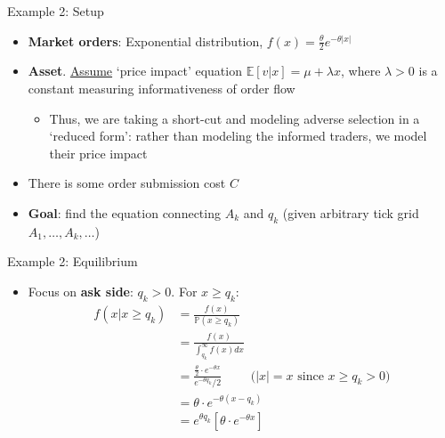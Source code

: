 \documentclass[english,10pt
,aspectratio=169
]{beamer}
\begin{document}
\begin{frame}{Example 2: Setup}
	\begin{itemize}
		\item \textbf{Market orders}: Exponential distribution, $f(x)=\frac{\theta}{2} e^{-\theta|x|}$
		\item \textbf{Asset}. \underline{Assume} `price impact' equation $\mathbb{E}[v|x] = \mu + \lambda x$, where $\lambda >0$ is a constant measuring informativeness of order flow
		\begin{itemize}
			\item Thus, we are taking a short-cut and modeling adverse selection in a `reduced form': rather than modeling the informed traders, we model their price impact
		\end{itemize}
		\item There is some order submission cost $C$
		\item \textbf{Goal}: find the equation connecting $A_k$ and $q_k$ (given arbitrary tick grid $A_1,\dots,A_k,\dots$)
	\end{itemize}
\end{frame}


\begin{frame}{Example 2: Equilibrium}
	\begin{itemize}
		\item Focus on \textbf{ask side}: $q_k>0$. For $x \geq q_k$:
		\begin{align*}
			f(x|x \geq q_k)&=\frac{f(x)}{ \mathbb{P}(x \geq q_k)} \\
			&= \frac{f(x)}{\int^\infty_{q_k} f(x) dx}\\
			&= \frac{\frac{\theta}{2} \cdot e^{-\theta x}}{e^{-\theta q_k}/2} \quad \quad \text{ ($|x|=x$ since $x \geq q_k>0$)}\\
			& =\theta \cdot e^{-\theta(x-q_k)}\\
			& = e^{\theta q_k} \left[ \theta \cdot e^{-\theta x} \right]
		\end{align*}
	\end{itemize}
\end{frame}
\end{document}
